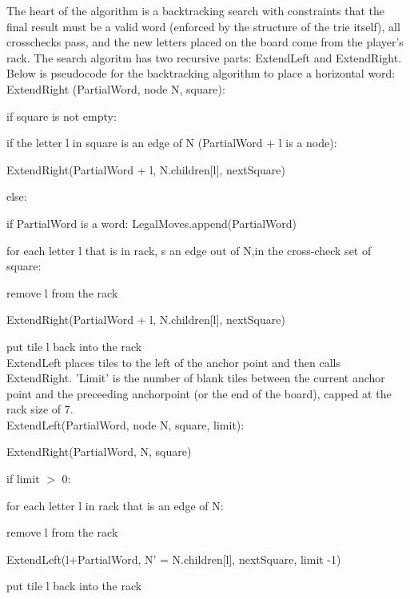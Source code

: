 \documentclass[12pt]{article}
\begin{document}
The heart of the algorithm is a backtracking search with constraints
that the final result must be a valid word (enforced by the structure
of the trie itself), all crosschecks pass, and the new letters placed
on the board come from the player's rack. The search algoritm has two
recursive parts: ExtendLeft and ExtendRight. Below is pseudocode for
the backtracking algorithm to place a horizontal word:\\

\quad ExtendRight (PartialWord, node N, square):

\quad\quad if square is not empty:

\quad\quad\quad if the letter l in square is an edge of N (PartialWord + l is a node):

\quad\quad\quad\quad ExtendRight(PartialWord + l, N.children[l], nextSquare)

\quad\quad else:

\quad\quad\quad if PartialWord is a word: LegalMoves.append(PartialWord)

\quad\quad\quad for each letter l that is in rack, s an edge out of N,in the cross-check set of square:

\quad\quad\quad\quad\quad remove l from the rack

\quad\quad\quad\quad\quad ExtendRight(PartialWord + l, N.children[l], nextSquare)

\quad\quad\quad\quad\quad put tile l back into the rack\\


ExtendLeft places tiles to the left
of the anchor point and then calls ExtendRight. 'Limit' is the number of blank tiles
between the current anchor point and the preceeding anchorpoint (or the end of the board), capped at the rack size of 7.\\

\quad ExtendLeft(PartialWord, node N, square, limit):

\quad\quad ExtendRight(PartialWord, N, square)

\quad\quad if limit $>$ 0: 

\quad\quad\quad for each letter l in rack that is an edge of N: 

\quad\quad\quad\quad remove l from the rack

\quad\quad\quad\quad ExtendLeft(l+PartialWord, N' =
N.children[l], nextSquare, limit -1)

\quad\quad\quad\quad put tile l back into the rack\\
			
\end{document}
